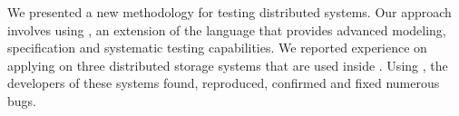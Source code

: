 We presented a new methodology for testing distributed systems. Our approach involves using \psharp, an extension of the \csharp language that provides advanced modeling, specification and systematic testing capabilities. We reported experience on applying \psharp on three distributed storage systems that are used inside \Microsoft. Using \psharp, the developers of these systems found, reproduced, confirmed and fixed numerous bugs.